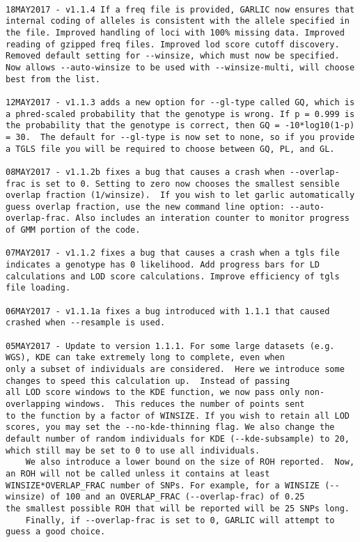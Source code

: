\documentclass[12pt]{article}%
\begin{document}
\begin{lstlisting}

18MAY2017 - v1.1.4 If a freq file is provided, GARLIC now ensures that internal coding of alleles is consistent with the allele specified in the file. Improved handling of loci with 100% missing data. Improved reading of gzipped freq files. Improved lod score cutoff discovery. Removed default setting for --winsize, which must now be specified. Now allows --auto-winsize to be used with --winsize-multi, will choose best from the list.

12MAY2017 - v1.1.3 adds a new option for --gl-type called GQ, which is a phred-scaled probability that the genotype is wrong. If p = 0.999 is the probability that the genotype is correct, then GQ = -10*log10(1-p) = 30.  The default for --gl-type is now set to none, so if you provide a TGLS file you will be required to choose between GQ, PL, and GL.

08MAY2017 - v1.1.2b fixes a bug that causes a crash when --overlap-frac is set to 0. Setting to zero now chooses the smallest sensible overlap fraction (1/winsize).  If you wish to let garlic automatically guess overlap fraction, use the new command line option: --auto-overlap-frac. Also includes an interation counter to monitor progress of GMM portion of the code.

07MAY2017 - v1.1.2 fixes a bug that causes a crash when a tgls file indicates a genotype has 0 likelihood. Add progress bars for LD calculations and LOD score calculations. Improve efficiency of tgls file loading.

06MAY2017 - v1.1.1a fixes a bug introduced with 1.1.1 that caused crashed when --resample is used.

05MAY2017 - Update to version 1.1.1. For some large datasets (e.g. WGS), KDE can take extremely long to complete, even when
only a subset of individuals are considered.  Here we introduce some changes to speed this calculation up.  Instead of passing
all LOD score windows to the KDE function, we now pass only non-overlapping windows.  This reduces the number of points sent
to the function by a factor of WINSIZE. If you wish to retain all LOD scores, you may set the --no-kde-thinning flag. We also change the default number of random individuals for KDE (--kde-subsample) to 20, which still may be set to 0 to use all individuals. 
	We also introduce a lower bound on the size of ROH reported.  Now, an ROH will not be called unless it contains at least
WINSIZE*OVERLAP_FRAC number of SNPs. For example, for a WINSIZE (--winsize) of 100 and an OVERLAP_FRAC (--overlap-frac) of 0.25
the smallest possible ROH that will be reported will be 25 SNPs long.
	Finally, if --overlap-frac is set to 0, GARLIC will attempt to guess a good choice.


\end{lstlisting}
\end{document}
